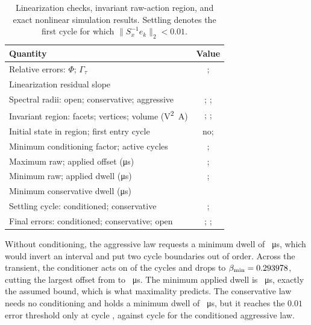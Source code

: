 \documentclass[pdflatex,iicol,sn-mathphys-ay]{sn-jnl}
\begin{document}
\begin{table}[t]
    \centering
    \caption{Linearization checks, invariant raw-action region, and exact nonlinear simulation results. Settling denotes the first cycle for which $\|S_x^{-1}e_k\|_2<0.01$.}
    \label{tab:results}
    \begin{tabular}{lc}
        \toprule
        Quantity & Value \\
        \midrule
        Relative errors: $\Phi$; $\Gamma_\tau$ & \PhiJacobianRelativeError{}; \GammaJacobianRelativeError{} \\
        Linearization residual slope & \LinearizationResidualSlope{} \\
        Spectral radii: open; conservative; aggressive & \OpenLoopSpectralRadius{}; \ConservativeSpectralRadius{}; \AggressiveSpectralRadius{} \\
        Invariant region: facets; vertices; volume (\si{\volt\squared\ampere}) & \InvariantRegionFacets{}; \InvariantRegionVertices{}; \InvariantRegionVolume{} \\
        Initial state in region; first entry cycle & no; \FirstInvariantRegionCycle{} \\
        Minimum conditioning factor; active cycles & \MinimumConditioningBeta{}; \ConditionedCycleCount{} \\
        Maximum raw; applied offset (\si{\micro\second}) & \MaximumRawOffset{}; \MaximumAppliedOffset{} \\
        Minimum raw; applied dwell (\si{\micro\second}) & \MinimumRawDwell{}; \MinimumAppliedDwell{} \\
        Minimum conservative dwell (\si{\micro\second}) & \MinimumConservativeDwell{} \\
        Settling cycle: conditioned; conservative & \ConditionedSettlingCycle{}; \ConservativeSettlingCycle{} \\
        Final errors: conditioned; conservative; open & \ConditionedFinalError{}; \ConservativeFinalError{}; \OpenLoopFinalError{} \\
        \bottomrule
    \end{tabular}
\end{table}

Without conditioning, the aggressive law requests a minimum dwell of \MinimumRawDwell{}~\si{\micro\second}, which would invert an interval and put two cycle boundaries out of order. Across the transient, the conditioner acts on \ConditionedCycleCount{} of the \SimulationCycles{} cycles and drops to $\beta_{\min}=0.293978{}$, cutting the largest offset from \MaximumRawOffset{} to \MaximumAppliedOffset{}~\si{\micro\second}. The minimum applied dwell is \MinimumAppliedDwell{}~\si{\micro\second}, exactly the assumed bound, which is what maximality predicts. The conservative law needs no conditioning and holds a minimum dwell of \MinimumConservativeDwell{}~\si{\micro\second}, but it reaches the $0.01$ error threshold only at cycle \ConservativeSettlingCycle{}, against cycle \ConditionedSettlingCycle{} for the conditioned aggressive law.
\end{document}
